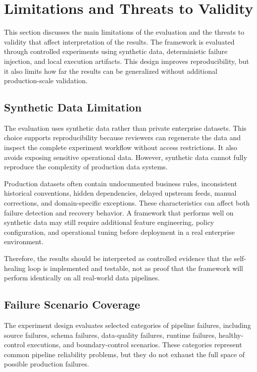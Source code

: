 \section{Limitations and Threats to Validity}
\label{sec:limitations}

This section discusses the main limitations of the evaluation and the threats to validity that affect interpretation of the results. The framework is evaluated through controlled experiments using synthetic data, deterministic failure injection, and local execution artifacts. This design improves reproducibility, but it also limits how far the results can be generalized without additional production-scale validation.

\subsection{Synthetic Data Limitation}

The evaluation uses synthetic data rather than private enterprise datasets. This choice supports reproducibility because reviewers can regenerate the data and inspect the complete experiment workflow without access restrictions. It also avoids exposing sensitive operational data. However, synthetic data cannot fully reproduce the complexity of production data systems.

Production datasets often contain undocumented business rules, inconsistent historical conventions, hidden dependencies, delayed upstream feeds, manual corrections, and domain-specific exceptions. These characteristics can affect both failure detection and recovery behavior. A framework that performs well on synthetic data may still require additional feature engineering, policy configuration, and operational tuning before deployment in a real enterprise environment.

Therefore, the results should be interpreted as controlled evidence that the self-healing loop is implemented and testable, not as proof that the framework will perform identically on all real-world data pipelines.

\subsection{Failure Scenario Coverage}

The experiment design evaluates selected categories of pipeline failures, including source failures, schema failures, data-quality failures, runtime failures, healthy-control executions, and boundary-control scenarios. These categories represent common pipeline reliability problems, but they do not exhaust the full space of possible production failures.


